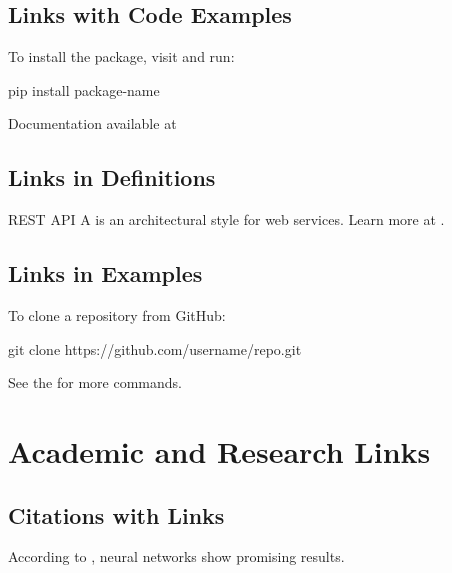 \documentclass{template_pid}
\begin{document}
\subsection{Links with Code Examples}

To install the package, visit  and run:

\begin{codeblock}
pip install package-name
\end{codeblock}

Documentation available at 

\subsection{Links in Definitions}

\begin{definition}{REST API}
A  is an architectural style for web services.
Learn more at .
\end{definition}

\subsection{Links in Examples}

\begin{example}
To clone a repository from GitHub:

\begin{codeblock}
git clone https://github.com/username/repo.git
\end{codeblock}

See the  for more commands.
\end{example}

\section{Academic and Research Links}

\subsection{Citations with Links}

According to ,
neural networks show promising results.
\end{document}
